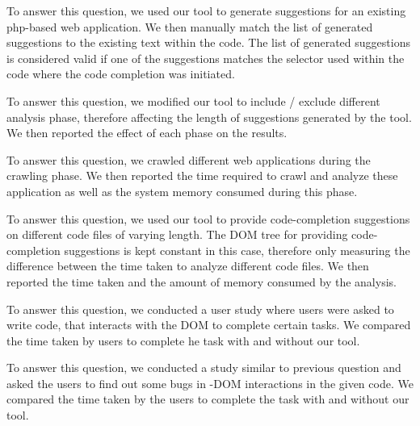 	 To answer this question, we used our tool to generate suggestions for an existing php-\javascript based web application. We then manually match the list of generated suggestions to the existing text within the \javascript code. The list of generated suggestions is considered valid if one of the suggestions matches the \css selector used within the code where the code completion was initiated.
	
	 To answer this question, we modified our tool to include / exclude different analysis phase, therefore affecting the length of suggestions generated by the tool. We then reported the effect of each phase on the results.
	
	 To answer this question, we crawled different web applications during the crawling phase. We then reported the time required to crawl and analyze these application as well as the system memory consumed during this phase.
	
	 To answer this question, we used our tool to provide code-completion suggestions on different \javascript code files of varying length. The DOM tree for providing code-completion suggestions is kept constant in this case, therefore only measuring the difference between the time taken to analyze different code files. We then reported the time taken and the amount of memory consumed by the analysis.
	
	 To answer this question, we conducted a user study where users were asked to write \javascript code, that interacts with the DOM to complete certain tasks. We compared the time taken by users to complete he task with and without our tool.
	
	 To answer this question, we conducted a study similar to previous question and asked the users to find out some bugs in \javascript-DOM interactions in the given \javascript code. We compared the time taken by the users to complete the task with and without our tool.
	 	
